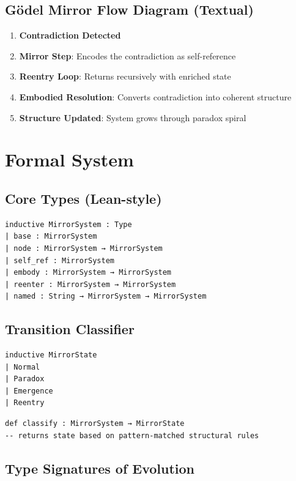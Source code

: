 \documentclass[manuscript,nonacm]{acmart}
\begin{document}
\subsection{Gödel Mirror Flow Diagram (Textual)}

\begin{enumerate}
\item \textbf{Contradiction Detected}
\item \textbf{Mirror Step}: Encodes the contradiction as self-reference
\item \textbf{Reentry Loop}: Returns recursively with enriched state
\item \textbf{Embodied Resolution}: Converts contradiction into coherent structure
\item \textbf{Structure Updated}: System grows through paradox spiral
\end{enumerate}

\section{Formal System}

\subsection{Core Types (Lean-style)}

\begin{verbatim}
inductive MirrorSystem : Type
| base : MirrorSystem
| node : MirrorSystem → MirrorSystem
| self_ref : MirrorSystem
| embody : MirrorSystem → MirrorSystem
| reenter : MirrorSystem → MirrorSystem
| named : String → MirrorSystem → MirrorSystem
\end{verbatim}

\subsection{Transition Classifier}

\begin{verbatim}
inductive MirrorState
| Normal 
| Paradox 
| Emergence 
| Reentry
\end{verbatim}

\begin{verbatim}
def classify : MirrorSystem → MirrorState
-- returns state based on pattern-matched structural rules
\end{verbatim}

\subsection{Type Signatures of Evolution}
\end{document}
